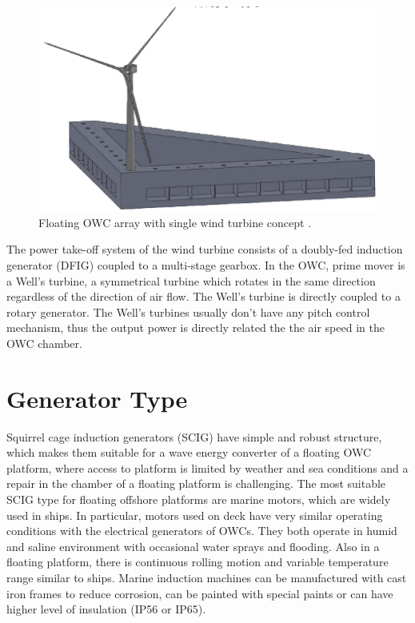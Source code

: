 \documentclass[twocolumn]{article}
\begin{document}
  \begin{figure}
    \centering
    \includegraphics[]{owc_array}
    \caption{Floating OWC array with single wind turbine concept \cite{Sullivan2013}.} 
    \label{owc_array}
  \end{figure}

The power take-off system of the wind turbine consists of a doubly-fed induction generator (DFIG) coupled to a multi-stage gearbox. In the OWC, prime mover is a Well's turbine, a symmetrical turbine which rotates in the same direction regardless of the direction of air flow. The Well's turbine is directly coupled to a rotary generator. The Well's turbines usually don't have any pitch control mechanism, thus the output power is directly related the the air speed in the OWC chamber.


\section{Generator Type}

Squirrel cage induction generators (SCIG) have simple and robust structure, which makes them suitable for a wave energy converter of a floating OWC platform, where access to platform is limited by weather and sea conditions and a repair in the chamber of a floating platform is challenging. 
The most suitable SCIG type for floating offshore platforms are marine motors, which are widely used in ships. In particular, motors used on deck have very similar operating conditions with the electrical generators of OWCs. They both operate in humid and saline environment with occasional water sprays and flooding. Also in a floating platform, there is continuous rolling motion and variable temperature range similar to ships. Marine induction machines can be manufactured  with cast iron frames to reduce corrosion, can be painted with special paints or can have higher level of insulation (IP56 or IP65). 
\end{document}
